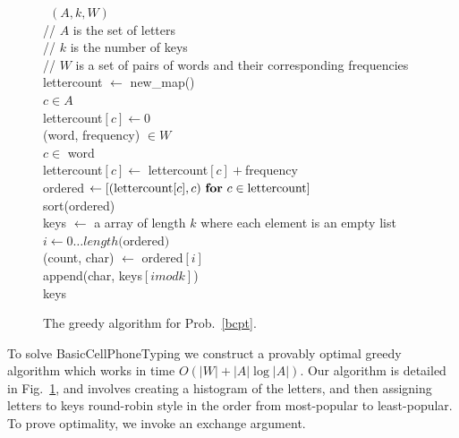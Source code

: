 \documentclass[runningheads]{llncs}
\begin{document}
\begin{figure}
\begin{algorithm}
~$(A, k, W)$\+\\
    // $A$ is the set of letters \\
    // $k$ is the number of keys \\
    // $W$ is a set of pairs of words and their corresponding frequencies \\
    lettercount $\gets$ new\_map() \\
    \For $c \in A$\+\\
        lettercount$[c] \gets 0$\-\\
    \For (word, frequency) $\in W$\+\\
        \For $c \in$ word \+\\
            lettercount$[c] \gets $ lettercount$[c] +$frequency\-\-\\
    ordered $\gets \left[ ({\rm lettercount}[c], c)~\For c \in {\rm lettercount} \right]$\\
    sort(ordered)\\
    keys $\gets$ a array of length $k$ where each element is an empty list\\
    \For $i \gets 0 \ldots length($ordered$)$\+\\
        (count, char) $\gets$ ordered$[i]$\\
        append(char, keys$[i mod k]$)\-\\
    \Return keys
\end{algorithm}
\caption{The greedy algorithm for Prob.~\ref{bcpt}.}
\label{greedyalg}
\end{figure}

To solve {\sc BasicCellPhoneTyping} we construct a provably optimal
greedy algorithm which works in time $O(|W| + |A| \log |A|)$.  Our algorithm is
detailed in Fig.~\ref{greedyalg}, and involves creating a histogram of the
letters, and then assigning letters to keys round-robin style in the order from
most-popular to least-popular.  To prove optimality, we invoke an exchange argument.
\end{document}
